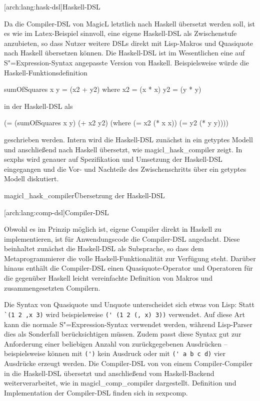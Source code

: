 \documentclass[12pt, a4paper, bibgerm]{scrbook}
\newenvironment{DIFnomarkup}{}{}
\newcommand\icode[1]{\lstinline?#1?}
\newcommand\lsubsection{}
\newcommand\cref{}
\newcommand\abb{}
\newcommand\fig{}
\newcommand{\sexp}{S"=Expression}
\begin{document}
\lsubsection[arch:lang:hask-dsl]{Haskell-DSL}

Da die Compiler-DSL von MagicL letztlich nach Haskell übersetzt werden
soll, ist es wie im Latex-Beispiel sinnvoll, eine eigene Haskell-DSL als
Zwischenstufe anzubieten, so dass Nutzer weitere DSLs direkt mit
Lisp-Makros und Quasiquote nach Haskell übersetzen können. Die
Haskell-DSL ist im Wesentlichen eine auf \sexp{}-Syntax angepasste
Version von Haskell. Beispielsweise würde die
Haskell-Funktionsdefinition
\begin{DIFnomarkup}
\begin{code}
sumOfSquares x y = (x2 + y2)
  where
    x2 = (x * x)            
    y2 = (y * y)
\end{code}
\end{DIFnomarkup}
in der Haskell-DSL als
\begin{DIFnomarkup}
\begin{code}
(= (sumOfSquares x y)
   (+ x2 y2)
  (where
    (= x2 (* x x))
    (= y2 (* y y))))
\end{code}
\end{DIFnomarkup}
geschrieben werden. Intern wird die Haskell-DSL zunächst in ein getyptes
Modell und anschließend nach Haskell übersetzt, wie
\abb{magicl_hask_compiler} zeigt. In \cref{sexphs} wird genauer auf
Spezifikation und Umsetzung der Haskell-DSL eingegangen und die Vor- und
Nachteile des Zwischenschritts über ein getyptes Modell diskutiert.

\fig{magicl_hask_compiler}{Übersetzung der Haskell-DSL}

\lsubsection[arch:lang:comp-dsl]{Compiler-DSL}

Obwohl es im Prinzip möglich ist, eigene Compiler direkt in Haskell zu
implementieren, ist für Anwendungscode die Compiler-DSL angedacht. Diese
beinhaltet zunächst die Haskell-DSL als Subsprache, so dass dem
Metaprogrammierer die volle Haskell-Funktionalität zur Verfügung steht.
Darüber hinaus enthält die Compiler-DSL einen Quasiquote-Operator und
Operatoren für die gegenüber Haskell leicht vereinfachte Definition von
Makros und zusammengesetzten Compilern.

Die Syntax von Quasiquote und Unquote unterscheidet sich etwas von Lisp:
Statt \icode{`(1 2 ,x 3)} wird beispielsweise \icode{(' (1 2 (, x) 3))}
verwendet. Auf diese Art kann die normale \sexp{}-Syntax verwendet
werden, während Lisp-Parser dies als Sonderfall berücksichtigen
müssen. Zudem passt diese Syntax gut zur Anforderung einer beliebigen
Anzahl von zurückgegebenen Ausdrücken -- beispielsweise können mit
\icode{(')} kein Ausdruck oder mit \icode{(' a b c d)} vier Ausdrücke
erzeugt werden. Die Compiler-DSL von von einem Compiler-Compiler in die
Haskell-DSL übersetzt und anschließend vom Haskell-Backend
weiterverarbeitet, wie in \abb{magicl_comp_compiler}
dargestellt. Definition und Implementation der Compiler-DSL finden sich
in \cref{sexpcomp}.
\end{document}
